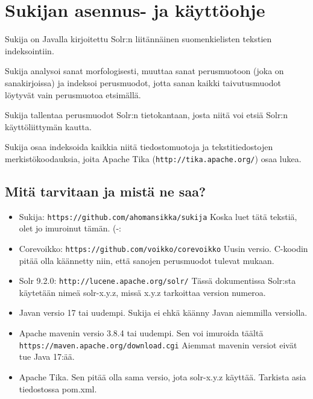 \documentclass[12pt]{article}
\begin{document}
\pagestyle{fancy}
\setlength{\parindent}{0pt}
\setlength{\parskip}{1ex plus 0.5ex minus 0.2ex}
\section*{Sukijan asennus- ja käyttöohje}


Sukija on Javalla kirjoitettu Solr:n liitännäinen suomenkielisten
tekstien indeksointiin.

Sukija analysoi sanat morfologisesti, muuttaa sanat perusmuotoon (joka
on sanakirjoissa) ja indeksoi perusmuodot, jotta sanan kaikki
taivutusmuodot löytyvät vain perusmuotoa etsimällä.

Sukija tallentaa perusmuodot Solr:n tietokantaan, josta niitä voi
etsiä Solr:n käyttöliittymän kautta.

Sukija osaa indeksoida kaikkia niitä tiedostomuotoja ja
tekstitiedostojen merkistökoodauksia, joita Apache Tika
(\verb=http://tika.apache.org/=) osaa lukea.


\subsection*{Mitä tarvitaan ja mistä ne saa?}

\begin{itemize}
\item Sukija:
      \verb=https://github.com/ahomansikka/sukija=
      Koska luet tätä tekstiä, olet jo imuroinut tämän. (-:

\item Corevoikko:
      \verb=https://github.com/voikko/corevoikko=
      Uusin versio. C-koodin pitää olla käännetty niin,
      että sanojen perusmuodot tulevat mukaan.

\item Solr 9.2.0:
      \verb=http://lucene.apache.org/solr/=
      Tässä dokumentissa Solr:sta käytetään nimeä solr-x.y.z,
      missä x.y.z tarkoittaa version numeroa.

\item Javan versio 17 tai uudempi. Sukija ei ehkä käänny Javan aiemmilla versiolla.

\item Apache mavenin versio 3.8.4 tai uudempi. Sen voi imuroida täältä
      \verb=https://maven.apache.org/download.cgi=
      Aiemmat mavenin versiot eivät tue Java 17:ää.

\item Apache Tika. Sen pitää olla sama versio, jota solr-x.y.z
      käyttää. Tarkista asia tiedostossa pom.xml.
\end{itemize}
\end{document}
